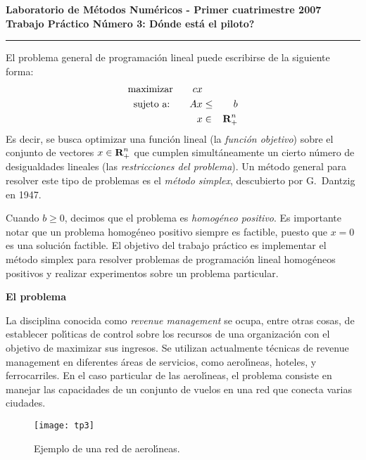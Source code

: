 \documentclass[11pt, a4paper]{article}
\begin{document}
\begin{centering}
\bf Laboratorio de M\'etodos Num\'ericos - Primer cuatrimestre 2007 \\
\bf Trabajo Pr\'actico N\'umero 3: D\'onde est\'a el piloto? \\
\end{centering}

\vskip 25pt
\hrule
\vskip 11pt

El problema general de programaci\'on lineal puede escribirse de la siguiente
forma:
\begin{eqnarray}
\hbox{maximizar} \qquad cx & & \nonumber \\
\hbox{sujeto a:} \qquad Ax & \le & b \nonumber \\
x & \in & \hbox{\bf R}^n_+ \nonumber
\end{eqnarray}
Es decir, se busca optimizar una funci\'on lineal (la \emph{funci\'on
objetivo}) sobre el conjunto de vectores $x\in\hbox{\bf R}^n_+$ que cumplen
simult\'aneamente un cierto n\'umero de desigualdades lineales (las
\emph{restricciones del problema}). Un m\'etodo general para resolver este
tipo de problemas es el \emph{m\'etodo simplex}, descubierto por G.~Dantzig
en 1947.

Cuando $b\ge 0$, decimos que el problema es \emph{homog\'eneo positivo}.
Es importante notar que un problema homog\'eneo positivo siempre es factible,
puesto que $x=0$ es una soluci\'on factible. El objetivo del trabajo
pr\'actico es implementar el m\'etodo simplex para resolver problemas de
programaci\'on lineal homog\'eneos positivos y realizar experimentos sobre
un problema particular.

\textbf{El problema}

La disciplina conocida como \emph{revenue management} se ocupa, entre otras
cosas, de establecer pol\'{\i}ticas de control sobre los recursos de una
organizaci\'on con el objetivo de maximizar sus ingresos. Se utilizan
actualmente t\'ecnicas de revenue management en diferentes \'areas de
servicios, como aerol\'{\i}neas, hoteles, y ferrocarriles. En el caso
particular de las aerol\'{\i}neas, el problema consiste en manejar las
capacidades de un conjunto de vuelos en una red que conecta varias ciudades.

\begin{figure}[h]
\begin{center}
\texttt{[image: tp3]} \\
\caption{Ejemplo de una red de aerol\'{\i}neas.}
\label{fig:Network}
\end{center}
\vspace*{-3mm}
\end{figure}
\end{document}
